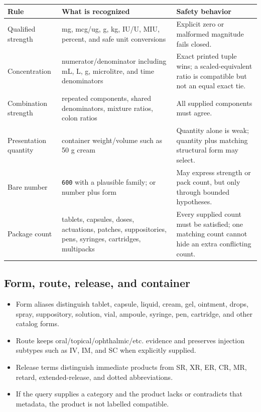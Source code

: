 \documentclass[10pt,a4paper]{article}
\newcommand{\observed}[1]{\texttt{#1}}
\begin{document}
\begin{tabularx}{\textwidth}{@{}L{39mm}Y L{48mm}@{}}
\toprule
Rule & What is recognized & Safety behavior \\
\midrule
Qualified strength & mg, mcg/ug, g, kg, IU/U, MIU, percent, and safe unit conversions & Explicit zero or malformed magnitude fails closed. \\
Concentration & numerator/denominator including mL, L, g, microlitre, and time denominators & Exact printed tuple wins; a scaled-equivalent ratio is compatible but not an equal exact tie. \\
Combination strength & repeated components, shared denominators, mixture ratios, colon ratios & All supplied components must agree. \\
Presentation quantity & container weight/volume such as 50 g cream & Quantity alone is weak; quantity plus matching structural form may select. \\
Bare number & \observed{600} with a plausible family; or number plus form & May express strength or pack count, but only through bounded hypotheses. \\
Package count & tablets, capsules, doses, actuations, patches, suppositories, pens, syringes, cartridges, multipacks & Every supplied count must be satisfied; one matching count cannot hide an extra conflicting count. \\
\bottomrule
\end{tabularx}

\Needspace{52mm}
\subsection{Form, route, release, and container}

\begin{itemize}
\item Form aliases distinguish tablet, capsule, liquid, cream, gel, ointment,
drops, spray, suppository, solution, vial, ampoule, syringe, pen, cartridge,
and other catalog forms.
\item Route keeps oral/topical/ophthalmic/etc. evidence and preserves injection
subtypes such as IV, IM, and SC when explicitly supplied.
\item Release terms distinguish immediate products from SR, XR, ER, CR, MR,
retard, extended-release, and dotted abbreviations.
\item If the query supplies a category and the product lacks or contradicts
that metadata, the product is not labelled compatible.
\end{itemize}
\end{document}
